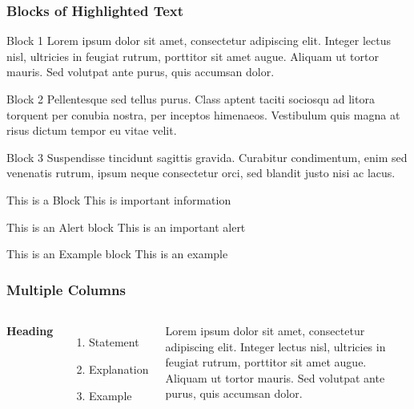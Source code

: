 \documentclass[t]{beamer}
\begin{document}

\begin{frame}
\frametitle{Blocks of Highlighted Text}
\begin{block}{Block 1}
Lorem ipsum dolor sit amet, consectetur adipiscing elit. Integer lectus nisl, ultricies in feugiat rutrum, porttitor sit amet augue. Aliquam ut tortor mauris. Sed volutpat ante purus, quis accumsan dolor.
\end{block}

\begin{block}{Block 2}
Pellentesque sed tellus purus. Class aptent taciti sociosqu ad litora torquent per conubia nostra, per inceptos himenaeos. Vestibulum quis magna at risus dictum tempor eu vitae velit.
\end{block}

\begin{block}{Block 3}
Suspendisse tincidunt sagittis gravida. Curabitur condimentum, enim sed venenatis rutrum, ipsum neque consectetur orci, sed blandit justo nisi ac lacus.
\end{block}
\end{frame}



\begin{frame}
 
   \begin{block}{This is a Block}
      This is important information
   \end{block}
 
   \begin{alertblock}{This is an Alert block}
   This is an important alert
   \end{alertblock}
 
   \begin{exampleblock}{This is an Example block}
   This is an example 
   \end{exampleblock}
 
\end{frame}


\begin{frame}
\frametitle{Multiple Columns}
\begin{columns}[c] %

\textbf{Heading}
\begin{enumerate}
\item Statement
\item Explanation
\item Example
\end{enumerate}

Lorem ipsum dolor sit amet, consectetur adipiscing elit. Integer lectus nisl, ultricies in feugiat rutrum, porttitor sit amet augue. Aliquam ut tortor mauris. Sed volutpat ante purus, quis accumsan dolor.

\end{columns}
\end{frame}
\end{document}
